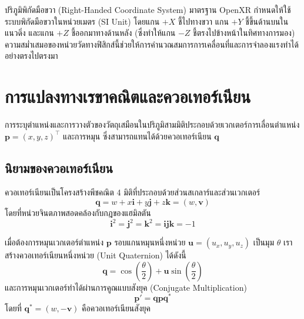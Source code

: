 \begin{stemconceptbox}{ปริภูมิพิกัดมือขวา (Right-Handed Coordinate System)}
มาตรฐาน OpenXR กำหนดให้ใช้ระบบพิกัดมือขวาในหน่วยเมตร (SI Unit) โดยแกน $+X$ ชี้ไปทางขวา แกน $+Y$ ชี้ขึ้นด้านบนในแนวดิ่ง และแกน $+Z$ ชี้ออกมาทางด้านหลัง (ซึ่งทำให้แกน $-Z$ ชี้ตรงไปข้างหน้าในทิศทางการมอง) ความสม่ำเสมอของหน่วยวัดทางฟิสิกส์นี้ช่วยให้การคำนวณสมการการเคลื่อนที่และการจำลองแรงทำได้อย่างตรงไปตรงมา
\end{stemconceptbox}

\section{การแปลงทางเรขาคณิตและควอเทอร์เนียน}

การระบุตำแหน่งและการวางตัวของวัตถุเสมือนในปริภูมิสามมิติประกอบด้วยเวกเตอร์การเลื่อนตำแหน่ง $\mathbf{p} = (x, y, z)^{\top}$ และการหมุน ซึ่งสามารถแทนได้ด้วยควอเทอร์เนียน $\mathbf{q}$

\subsection{นิยามของควอเทอร์เนียน}

ควอเทอร์เนียนเป็นโครงสร้างพีชคณิต 4 มิติที่ประกอบด้วยส่วนสเกลาร์และส่วนเวกเตอร์
\begin{equation}
\mathbf{q} = w + x\mathbf{i} + y\mathbf{j} + z\mathbf{k} = (w, \mathbf{v})
\end{equation}
โดยที่หน่วยจินตภาพสอดคล้องกับกฎของแฮมิลตัน
\begin{equation}
\mathbf{i}^2 = \mathbf{j}^2 = \mathbf{k}^2 = \mathbf{i}\mathbf{j}\mathbf{k} = -1
\end{equation}

เมื่อต้องการหมุนเวกเตอร์ตำแหน่ง $\mathbf{p}$ รอบแกนหมุนหนึ่งหน่วย $\mathbf{u} = (u_x, u_y, u_z)$ เป็นมุม $\theta$ เราสร้างควอเทอร์เนียนหนึ่งหน่วย (Unit Quaternion) ได้ดังนี้
\begin{equation}
\mathbf{q} = \cos\left(\frac{\theta}{2}\right) + \mathbf{u}\sin\left(\frac{\theta}{2}\right)
\end{equation}
และการหมุนเวกเตอร์ทำได้ผ่านการคูณแบบสังยุค (Conjugate Multiplication)
\begin{equation}
\mathbf{p}' = \mathbf{q} \mathbf{p} \mathbf{q}^*
\end{equation}
โดยที่ $\mathbf{q}^* = (w, -\mathbf{v})$ คือควอเทอร์เนียนสังยุค

